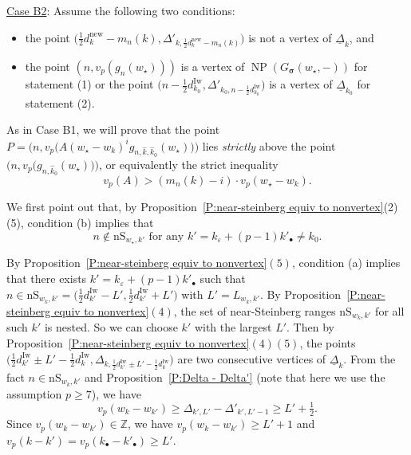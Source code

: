 \documentclass[12pt]{amsart}
\theoremstyle{definition}
\numberwithin{equation}{subsection}
\def\ZZ{\mathbb{Z}}
\DeclareMathOperator{\NP}{NP}
\newcommand{\bbsigma}{\boldsymbol{\sigma}}
\newcommand{\new}{\mathrm{new}}
\newcommand{\Iw}{\mathrm{Iw}}
\newcommand{\nS}{\mathrm{nS}}
\begin{document}
\smallskip
\underline{Case B2}:  Assume the following two conditions:
\begin{itemize}
\item[(a)] the point $\big(\tfrac 12 d_k^\new-m_n(k), \Delta'_{k,\frac 12 d_k^\new-m_n(k)} \big)$ is not a vertex of $\underline\Delta_k$, and 
\item[(b)] the point $( n,v_p(g_n(w_\star) ) )$ is a vertex of $\NP(G_{\bbsigma}(w_\star,-))$ for statement (1) or the point $\big( n- \frac 12d_{k_0}^\Iw, \Delta'_{k_0,n-\frac 12d_{k_0}^\Iw}\big)$ is a vertex of $\underline \Delta_{k_0}$ for statement (2).
\end{itemize} 
As in Case B1, we will prove that the point $P = \big(n,v_p\big(A(w_\star-w_k)^ig_{n,\hat{ k},\hat{ k}_0}(w_\star)\big)\big)$ lies \emph{strictly} above the point $\big(n, v_p\big( g_{n,\hat{k}_0}(w_\star)\big) \big)$, or equivalently the strict inequality
\begin{equation}
\label{E:vpA bigger than wstar-wk}
v_p(A) > (m_n(k) - i) \cdot  v_p(w_\star - w_k).
\end{equation}

We first point out that, by Proposition~\ref{P:near-steinberg equiv to nonvertex}(2)(5), condition (b) implies that
\begin{equation}\label{E:n notin nS w_star, k' for any k' in case B}
    n \notin \nS_{w_\star, k'} \text{~for any~}k'= k_\varepsilon +(p-1)k'_\bullet \neq k_0.
\end{equation}

By Proposition~\ref{P:near-steinberg equiv to nonvertex}$(5)$, condition (a) implies that there exists $k'=k_\varepsilon+(p-1)k'_\bullet$ such that $n\in \nS_{w_k,k'}=\big( \frac 12 d_{k'}^\Iw-L', \frac 12 d_{k'}^\Iw+L' \big)$ with $L'=L_{w_k,k'}$. By Proposition~\ref{P:near-steinberg equiv to nonvertex}$(4)$, the set of near-Steinberg ranges $\nS_{w_k,k'}$ for all such $k'$ is nested. So we can choose $k'$ with the largest $L'$.  Then by Proposition~\ref{P:near-steinberg equiv to nonvertex}$(4)(5)$, the points $\big(\frac 12 d_{k'}^\Iw\pm L'-\frac 12 d_k^\Iw,\Delta_{k,\frac 12 d_{k'}^\Iw\pm L'-\frac 12 d_k^\Iw} \big)$ are two consecutive vertices of $\underline \Delta_k$. From the fact $n\in \nS_{w_k,k'}$ and Proposition~\ref{P:Delta - Delta'} (note that here we use the assumption $p\geq 7$), we have 
	\begin{equation}
	\label{E:vp wk-wk' geq L'}
	v_p(w_k- w_{k'}) \geq \Delta_{k', L'} - \Delta'_{k', L'-1}\geq L'+\tfrac 12.
	\end{equation}
	Since $v_p(w_k-w_{k'})\in \ZZ$, we have $v_p(w_k-w_{k'})\geq L'+1$ and $v_p(k-k')=v_p(k_\bullet-k'_\bullet)\geq L'$. 
    
\end{document}
